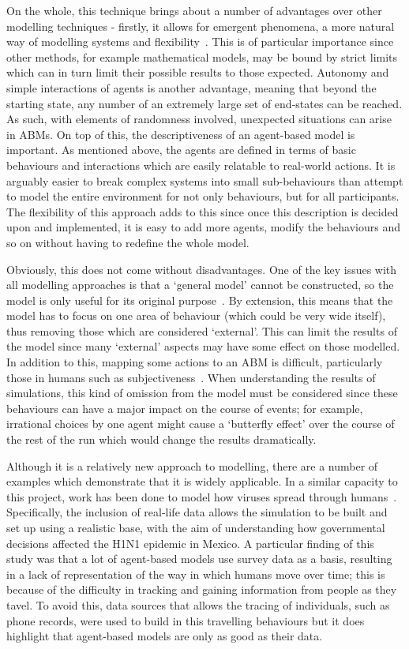 \documentclass[]{report}
\begin{document}
On the whole, this technique brings about a number of advantages over other modelling techniques - firstly, it allows for emergent phenomena, a more natural way of modelling systems and flexibility~\cite{ABMMethTech}. This is of particular importance since other methods, for example mathematical models, may be bound by strict limits which can in turn limit their possible results to those expected. Autonomy and simple interactions of agents is another advantage, meaning that beyond the starting state, any number of an extremely large set of end-states can be reached. As such, with elements of randomness involved, unexpected situations can arise in ABMs. On top of this, the descriptiveness of an agent-based model is important. As mentioned above, the agents are defined in terms of basic behaviours and interactions which are easily relatable to real-world actions. It is arguably easier to break complex systems into small sub-behaviours than attempt to model the entire environment for not only behaviours, but for all participants. The flexibility of this approach adds to this since once this description is decided upon and implemented, it is easy to add more agents, modify the behaviours and so on without having to redefine the whole model.

Obviously, this does not come without disadvantages. One of the key issues with all modelling approaches is that a `general model' cannot be constructed, so the model is only useful for its original purpose~\cite{UCL-ABM}. By extension, this means that the model has to focus on one area of behaviour (which could be very wide itself), thus removing those which are considered `external'. This can limit the results of the model since many `external' aspects may have some effect on those modelled. In addition to this, mapping some actions to an ABM is difficult, particularly those in humans such as subjectiveness~\cite{ABMMethTech}. When understanding the results of simulations, this kind of omission from the model must be considered since these behaviours can have a major impact on the course of events; for example, irrational choices by one agent might cause a `butterfly effect' over the course of the rest of the run which would change the results dramatically.

Although it is a relatively new approach to modelling, there are a number of examples which demonstrate that it is widely applicable. In a similar capacity to this project, work has been done to model how viruses spread through humans~\cite{ABM-IEEE}. Specifically, the inclusion of real-life data allows the simulation to be built and set up using a realistic base, with the aim of understanding how governmental decisions affected the H1N1 epidemic in Mexico. A particular finding of this study was that a lot of agent-based models use survey data as a basis, resulting in a lack of representation of the way in which humans move over time; this is because of the difficulty in tracking and gaining information from people as they tavel. To avoid this, data sources that allows the tracing of individuals, such as phone records, were used to build in this travelling behaviours but it does highlight that agent-based models are only as good as their data.
\end{document}
